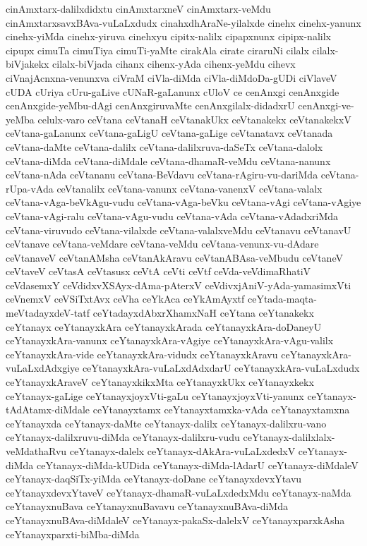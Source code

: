 {cinAmxtarx-dalilxdidxtu
cinAmxtarxneV
cinAmxtarx-veMdu
cinAmxtarxsavxBAva-vuLaLxdudx
cinahxdhAraNe-yilalxde
cinehx
cinehx-yanunx
cinehx-yiMda
cinehx-yiruva
cinehxyu
cipitx-nalilx
cipapxnunx
cipipx-nalilx
cipupx
cimuTa
cimuTiya
cimuTi-yaMte
cirakAla
cirate
ciraruNi
cilalx
cilalx-biVjakekx
cilalx-biVjada
cihanx
cihenx-yAda
cihenx-yeMdu
cihevx
ciVnajAcnxna-venunxva
ciVraM
ciVla-diMda
ciVla-diMdoDa-gUDi
ciVlaveV
cUDA
cUriya
cUru-gaLive
cUNaR-gaLanunx
cUloV
ce
cenAnxgi
cenAnxgide
cenAnxgide-yeMbu-dAgi
cenAnxgiruvaMte
cenAnxgilalx-didadxrU
cenAnxgi-ve-yeMba
celulx-varo
ceVtana
ceVtanaH
ceVtanakUkx
ceVtanakekx
ceVtanakekxV
ceVtana-gaLanunx
ceVtana-gaLigU
ceVtana-gaLige
ceVtanatavx
ceVtanada
ceVtana-daMte
ceVtana-dalilx
ceVtana-dalilxruva-daSeTx
ceVtana-dalolx
ceVtana-diMda
ceVtana-diMdale
ceVtana-dhamaR-veMdu
ceVtana-nanunx
ceVtana-nAda
ceVtananu
ceVtana-BeVdavu
ceVtana-rAgiru-vu-dariMda
ceVtana-rUpa-vAda
ceVtanalilx
ceVtana-vanunx
ceVtana-vanenxV
ceVtana-valalx
ceVtana-vAga-beVkAgu-vudu
ceVtana-vAga-beVku
ceVtana-vAgi
ceVtana-vAgiye
ceVtana-vAgi-ralu
ceVtana-vAgu-vudu
ceVtana-vAda
ceVtana-vAdadxriMda
ceVtana-viruvudo
ceVtana-vilalxde
ceVtana-valalxveMdu
ceVtanavu
ceVtanavU
ceVtanave
ceVtana-veMdare
ceVtana-veMdu
ceVtana-venunx-vu-dAdare
ceVtanaveV
ceVtanAMsha
ceVtanAkAravu
ceVtanABAsa-veMbudu
ceVtaneV
ceVtaveV
ceVtasA
ceVtasusx
ceVtA
ceVti
ceVtf
ceVda-veVdimaRhatiV
ceVdasemxY
ceVdidxvXSAyx-dAma-pAterxV
ceVdivxjAniV-yAda-yamasimxVti
ceVnemxV
ceVSiTxtAvx
ceVha
ceYkAca
ceYkAmAyxtf
ceYtada-maqta-meVtadayxdeV-tatf
ceYtadayxdAbxrXhamxNaH
ceYtana
ceYtanakekx
ceYtanayx
ceYtanayxkAra
ceYtanayxkArada
ceYtanayxkAra-doDaneyU
ceYtanayxkAra-vanunx
ceYtanayxkAra-vAgiye
ceYtanayxkAra-vAgu-valilx
ceYtanayxkAra-vide
ceYtanayxkAra-vidudx
ceYtanayxkAravu
ceYtanayxkAra-vuLaLxdAdxgiye
ceYtanayxkAra-vuLaLxdAdxdarU
ceYtanayxkAra-vuLaLxdudx
ceYtanayxkAraveV
ceYtanayxkikxMta
ceYtanayxkUkx
ceYtanayxkekx
ceYtanayx-gaLige
ceYtanayxjoyxVti-gaLu
ceYtanayxjoyxVti-yanunx
ceYtanayx-tAdAtamx-diMdale
ceYtanayxtamx
ceYtanayxtamxka-vAda
ceYtanayxtamxna
ceYtanayxda
ceYtanayx-daMte
ceYtanayx-dalilx
ceYtanayx-dalilxru-vano
ceYtanayx-dalilxruvu-diMda
ceYtanayx-dalilxru-vudu
ceYtanayx-dalilxlalx-veMdathaRvu
ceYtanayx-dalelx
ceYtanayx-dAkAra-vuLaLxdedxV
ceYtanayx-diMda
ceYtanayx-diMda-kUDida
ceYtanayx-diMda-lAdarU
ceYtanayx-diMdaleV
ceYtanayx-daqSiTx-yiMda
ceYtanayx-doDane
ceYtanayxdevxYtavu
ceYtanayxdevxYtaveV
ceYtanayx-dhamaR-vuLaLxdedxMdu
ceYtanayx-naMda
ceYtanayxnuBava
ceYtanayxnuBavavu
ceYtanayxnuBAva-diMda
ceYtanayxnuBAva-diMdaleV
ceYtanayx-pakaSx-dalelxV
ceYtanayxparxkAsha
ceYtanayxparxti-biMba-diMda
}
